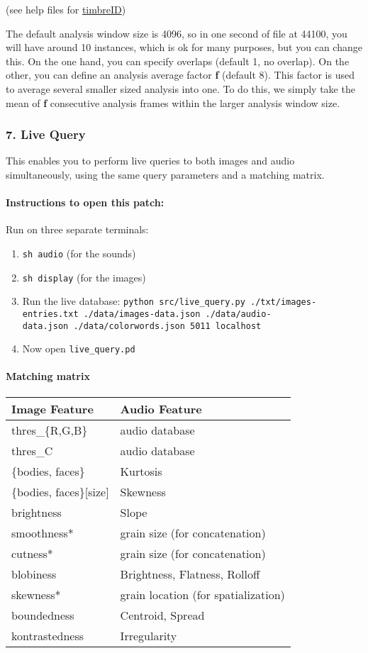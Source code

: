 (see help files for \href{https://github.com/wbrent/timbreID}{timbreID})

The default analysis window size is 4096, so in one second of file at 44100, you will have around 10 instances, which is ok for many purposes, but you can change this. On the one hand, you can specify overlaps (default 1, no overlap). On the other, you can define an analysis average factor \textbf{f} (default 8). This factor is used to average several smaller sized analysis into one. To do this, we simply take the mean of \textbf{f} consecutive analysis frames within the larger analysis window size.



\subsubsection{7. Live Query}

This enables you to perform live queries to both images and audio simultaneously, using the same query parameters and a matching matrix.


\paragraph{Instructions to open this patch:}

Run on three separate terminals:

\begin{enumerate}
\def\labelenumi{\arabic{enumi}.}
\tightlist
\item
  \texttt{sh\ audio} (for the sounds)
\item
  \texttt{sh\ display} (for the images)
\item
  Run the live database: \texttt{python\ src/live\_query.py\ ./txt/images-entries.txt\ ./data/images-data.json\ ./data/audio-data.json\ ./data/colorwords.json\ 5011\ localhost}
\item
  Now open \texttt{live\_query.pd}
\end{enumerate}


\paragraph{Matching matrix}

\begin{longtable}[]{@{}ll@{}}
\toprule
Image Feature & Audio Feature\tabularnewline
\midrule
\endhead
thres\_\{R,G,B\} & audio database\tabularnewline
thres\_C & audio database\tabularnewline
\{bodies, faces\} & Kurtosis\tabularnewline
\{bodies, faces\}{[}size{]} & Skewness\tabularnewline
brightness & Slope\tabularnewline
smoothness* & grain size (for concatenation)\tabularnewline
cutness* & grain size (for concatenation)\tabularnewline
blobiness & Brightness, Flatness, Rolloff\tabularnewline
skewness* & grain location (for spatialization)\tabularnewline
boundedness & Centroid, Spread\tabularnewline
kontrastedness & Irregularity\tabularnewline
\bottomrule
\end{longtable}

